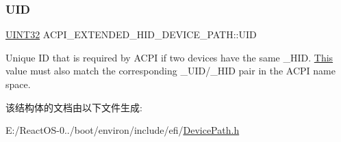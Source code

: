 \subsubsection{\texorpdfstring{U\+ID}{UID}}
{\footnotesize\ttfamily \hyperlink{_processor_bind_8h_ae1e6edbbc26d6fbc71a90190d0266018}{U\+I\+N\+T32} A\+C\+P\+I\+\_\+\+E\+X\+T\+E\+N\+D\+E\+D\+\_\+\+H\+I\+D\+\_\+\+D\+E\+V\+I\+C\+E\+\_\+\+P\+A\+T\+H\+::\+U\+ID}

Unique ID that is required by A\+C\+PI if two devices have the same \+\_\+\+H\+ID. \hyperlink{namespace_this}{This} value must also match the corresponding \+\_\+\+U\+I\+D/\+\_\+\+H\+ID pair in the A\+C\+PI name space. 

该结构体的文档由以下文件生成\+:\begin{DoxyCompactItemize}
\item 
E\+:/\+React\+O\+S-\/0../boot/environ/include/efi/\hyperlink{_device_path_8h}{Device\+Path.\+h}\end{DoxyCompactItemize}
